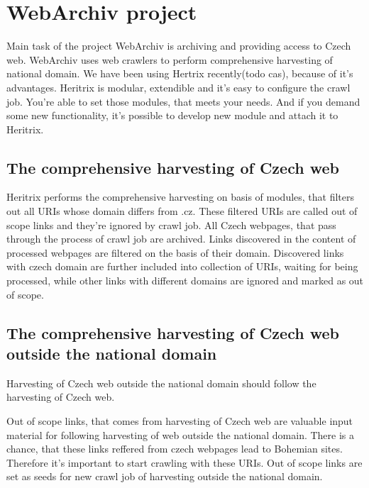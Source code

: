 \documentclass[11pt,a4paper]{article}
\begin{document}

\newpage
\section{WebArchiv project}

Main task of the project WebArchiv is archiving and providing access to Czech web. WebArchiv uses web crawlers to perform comprehensive harvesting of national domain. We have been using Hertrix recently(todo cas), because of it's advantages. Heritrix is modular, extendible and it's easy to configure the crawl job. You're able to set those modules, that meets your needs. And if you demand some new functionality, it's possible to develop new module and attach it to Heritrix.

\subsection{The comprehensive harvesting of Czech web}
Heritrix performs the comprehensive harvesting on basis of modules, that filters out all URIs whose domain differs from .cz. These filtered URIs are called out of scope links and they're ignored by crawl job. All Czech webpages, that pass through the process of crawl job are archived. Links discovered in the content of processed webpages are filtered on the basis of their domain. Discovered links with czech domain are further included into collection of URIs, waiting for being processed, while other links with different domains are ignored and marked as out of scope.

\subsection{The comprehensive harvesting of Czech web outside the national domain}
Harvesting of Czech web outside the national domain should follow the harvesting of Czech web. 

Out of scope links, that comes from harvesting of Czech web are valuable input material for following harvesting of web outside the national domain. There is a chance, that these links reffered from czech webpages lead to Bohemian sites. Therefore it's important to start crawling with these URIs. Out of scope links are set as seeds for new crawl job of harvesting outside the national domain.

\end{document}

